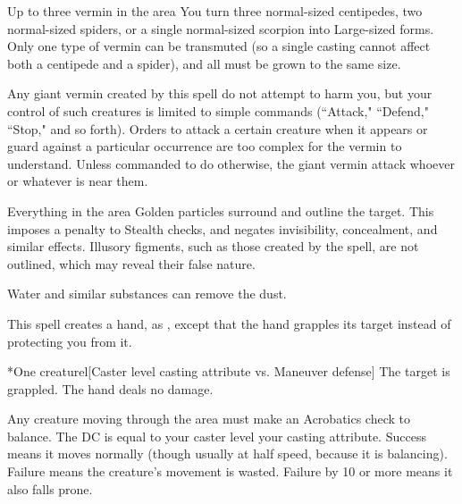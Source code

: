 \spelldur{\durmed}
\begin{spelltarget}{Up to three vermin in the area}
    \spelleffect You turn three normal-sized centipedes, two normal-sized spiders, or a single normal-sized scorpion into Large-sized forms. Only one type of vermin can be transmuted (so a single casting cannot affect both a centipede and a spider), and all must be grown to the same size.
    \par Any giant vermin created by this spell do not attempt to harm you, but your control of such creatures is limited to simple commands (``Attack," ``Defend," ``Stop," and so forth). Orders to attack a certain creature when it appears or guard against a particular occurrence are too complex for the vermin to understand. Unless commanded to do otherwise, the giant vermin attack whoever or whatever is near them.
\end{spelltarget}

\spelldur{\durshort}
\begin{spelltarget}{Everything in the area}
    \spelleffect Golden particles surround and outline the target. This imposes a  penalty to Stealth checks, and negates invisibility, concealment, and similar effects. Illusory figments, such as those created by the  spell, are not outlined, which may reveal their false nature.
\end{spelltarget}
\spellnotes Water and similar substances can remove the dust.

\spellrng{\rngmed}
\spelldur{\durshort \dismissable}
\spellline
\spelleffect This spell creates a hand, as , except that the hand grapples its target instead of protecting you from it.
\begin{spelltarget}*{One creature}l[Caster level \add casting attribute vs. Maneuver defense]
    \spellsuccess The target is grappled. The hand deals no damage.
\end{spelltarget}

\spelldur{\durshort \dismissable}
\spellline
\spelleffect Any creature moving through the area must make an Acrobatics check to balance. The DC is equal to your caster level \add your casting attribute. Success means it moves normally (though usually at half speed, because it is balancing). Failure means the creature's movement is wasted. Failure by 10 or more means it also falls prone.

